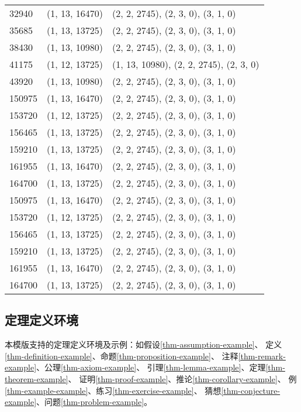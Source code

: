 \begin{longtable}{|l|l|l|}
    32940  & (1, 13, 16470) & (2,  2,  2745), (2,  3,    0), (3, 1, 0) \\
    35685  & (1, 13, 13725) & (2,  2,  2745), (2,  3,    0), (3, 1, 0) \\
    38430  & (1, 13, 10980) & (2,  2,  2745), (2,  3,    0), (3, 1, 0) \\
    41175  & (1, 12, 13725) & (1, 13, 10980), (2,  2, 2745), (2, 3, 0) \\
    43920  & (1, 13, 10980) & (2,  2,  2745), (2,  3,    0), (3, 1, 0) \\
    150975 & (1, 13, 16470) & (2,  2,  2745), (2,  3,    0), (3, 1, 0) \\
    153720 & (1, 12, 13725) & (2,  2,  2745), (2,  3,    0), (3, 1, 0) \\
    156465 & (1, 13, 13725) & (2,  2,  2745), (2,  3,    0), (3, 1, 0) \\
    159210 & (1, 13, 13725) & (2,  2,  2745), (2,  3,    0), (3, 1, 0) \\
    161955 & (1, 13, 16470) & (2,  2,  2745), (2,  3,    0), (3, 1, 0) \\
    164700 & (1, 13, 13725) & (2,  2,  2745), (2,  3,    0), (3, 1, 0) \\
    150975 & (1, 13, 16470) & (2,  2,  2745), (2,  3,    0), (3, 1, 0) \\
    153720 & (1, 12, 13725) & (2,  2,  2745), (2,  3,    0), (3, 1, 0) \\
    156465 & (1, 13, 13725) & (2,  2,  2745), (2,  3,    0), (3, 1, 0) \\
    159210 & (1, 13, 13725) & (2,  2,  2745), (2,  3,    0), (3, 1, 0) \\
    161955 & (1, 13, 16470) & (2,  2,  2745), (2,  3,    0), (3, 1, 0) \\
    164700 & (1, 13, 13725) & (2,  2,  2745), (2,  3,    0), (3, 1, 0) \\
\end{longtable}


\subsection{定理定义环境}
\label{subsec-thm}
本模版支持的定理定义环境及示例：如假设\ref{thm-assumption-example}、
定义\ref{thm-definition-example}、命题\ref{thm-proposition-example}、
注释\ref{thm-remark-example}、公理\ref{thm-axiom-example}、
引理\ref{thm-lemma-example}、定理\ref{thm-theorem-example}、
证明\ref{thm-proof-example}、推论\ref{thm-corollary-example}、
例\ref{thm-example-example}、练习\ref{thm-exercise-example}、
猜想\ref{thm-conjecture-example}、问题\ref{thm-problem-example}。

